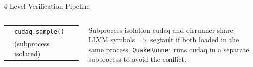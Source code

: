 \documentclass[aspectratio=169,10pt]{beamer}
\begin{document}
\begin{frame}[fragile]{4-Level Verification Pipeline}
\begin{columns}[T]
\begin{tabular}{@{}lp{3.0cm}@{}}
                             & \texttt{cudaq.sample()}\\
                             & (subprocess isolated) \\
        \bottomrule
      \end{tabular}
      \vspace{4pt}
      \begin{alertblock}{\small Subprocess isolation}
        \scriptsize
        cudaq and qirrunner share LLVM symbols $\Rightarrow$
        segfault if both loaded in the same process.
        \texttt{QuakeRunner} runs cudaq in a separate
        subprocess to avoid the conflict.
      \end{alertblock}
  \end{columns}
\end{frame}
\end{document}
